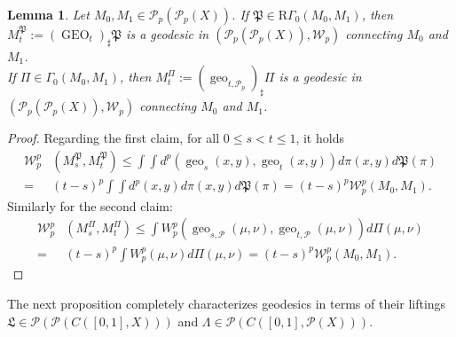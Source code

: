 \documentclass[10pt,leqno]{amsart}
\numberwithin{equation}{section}
\newtheorem{lemma}[teorema]{Lemma}
\newcommand{\PP}{\mathcal{P}}
\begin{document}
\begin{lemma}\label{lemma: geodesics through opt couplings}
    Let $M_0,M_1\in \PP_p(\PP_p(X))$. If $\mathfrak{P}\in \mathrm{R}\Gamma_0(M_0,M_1)$, then $M_t^{\mathfrak{P}}:=(\operatorname{GEO}_t)_\sharp \mathfrak{P}$ is a geodesic in $(\PP_p(\PP_p(X)),\mathcal{W}_p)$ connecting $M_0$ and $M_1$. 
    \\
    If $\Pi\in \Gamma_0(M_0,M_1)$, then $M_t^{\Pi}:= (\operatorname{geo}_{t,\PP_p})_\sharp \Pi$ is a geodesic in $(\PP_p(\PP_p(X)),\mathcal{W}_p)$ connecting $M_0$ and $M_1$.
\end{lemma}
\begin{proof}
    Regarding the first claim, for all $0\leq s<t \leq 1$, it holds
    \begin{align*}
        \mathcal{W}_p^p & (M_s^{\mathfrak{P}},M_t^{\mathfrak{P}}) \leq  \int \int d^p(\operatorname{geo}_s(x,y), \operatorname{geo}_t(x,y)) d\pi(x,y)d\mathfrak{P}(\pi) 
        \\
        = & (t-s)^p \int \int d^p(x,y)d\pi(x,y)d\mathfrak{P}(\pi) = (t-s)^p \mathcal{W}_p^p(M_0,M_1).
    \end{align*}
    Similarly for the second claim:
    \begin{align*}
        \mathcal{W}_p^p & (M_s^{\Pi}, M_t^{\Pi}) \leq  \int W_p^p (\operatorname{geo}_{s,\PP}(\mu,\nu),\operatorname{geo}_{t,\PP}(\mu,\nu)) d\Pi(\mu,\nu) 
        \\
        = & (t-s)^p \int  W_p^p(\mu,\nu)d\Pi(\mu,\nu) = (t-s)^p \mathcal{W}_p^p(M_0,M_1).
    \end{align*}
\end{proof}

The next proposition completely characterizes geodesics in terms of their liftings $\mathfrak{L}\in \PP(\PP(C([0,1],X)))$ and $\Lambda \in \PP(C([0,1],\PP(X)))$.
\end{document}
